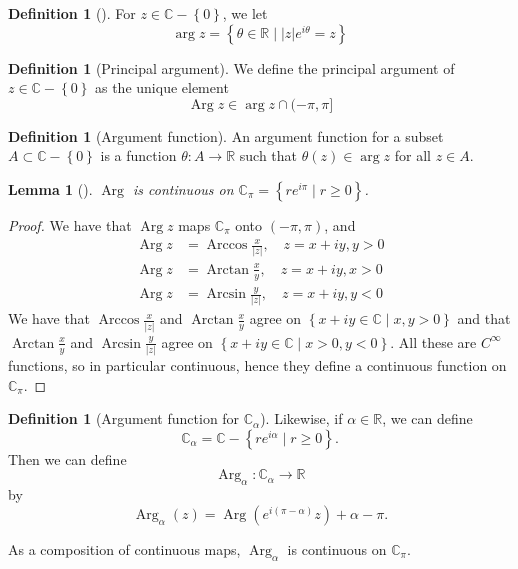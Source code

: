 \documentclass[reqno]{amsart}
\theoremstyle{plain}%
\newtheorem{lemma}[theorem]{Lemma}
\theoremstyle{definition}
\newtheorem{definition}[theorem]{Definition}
\theoremstyle{remark}
\DeclareMathOperator{\Arg}{Arg}
\DeclareMathOperator{\Arctan}{Arctan}
\DeclareMathOperator{\Arcsin}{Arcsin}
\DeclareMathOperator{\Arccos}{Arccos}
\begin{document}
    \begin{definition}[]
        For $z \in \mathbb{C} - \left\{ 0 \right\} $, we let
        \[
        \arg z = \left\{ \theta \in \mathbb{R}  \mid |z| e^{i \theta} = z \right\} 
        \] 
    \end{definition}

    \begin{definition}[Principal argument]
        We define the principal argument of $z \in \mathbb{C} - \left\{
        0 \right\} $ as the unique element
        \[
            \Arg z \in \arg z \cap (- \pi , \pi ]
        \] 
    \end{definition}

    \begin{definition}[Argument function]
        An argument function for a subset $A \subset \mathbb{C} - \left\{
        0 \right\} $ is a function 
        $\theta  \colon A \to \mathbb{R}$ such that 
        $\theta (z) \in \arg z$ for all $z \in A$.
    \end{definition}

    \begin{lemma}[]
        $\Arg $ is continuous on $\mathbb{C}_\pi = \left\{ r e^{i \pi}  \mid
        r \ge 0 \right\} $.
    \end{lemma}

    \begin{proof}
        We have that $\Arg z$ maps $\mathbb{C}_\pi$ onto $\left( -\pi , \pi
        \right) $, and
        \begin{align*}
            \Arg z &= \Arccos \frac{x}{|z|}, \quad z = x+iy, y > 0\\
            \Arg z &= \Arctan \frac{x}{y}, \quad z = x+iy, x>0\\
            \Arg z &= \Arcsin \frac{y}{|z|}, \quad z = x+iy, y<0
        \end{align*}
        We have that $\Arccos \frac{x}{|z|}$ and
        $\Arctan \frac{x}{y}$ agree on $\left\{ x+iy \in \mathbb{C}  \mid 
        x,y >0 \right\} $ and
        that $\Arctan \frac{x}{y}$ and
        $\Arcsin \frac{y}{|z|}$ agree on
        $\left\{ x+iy \in \mathbb{C}  \mid  x>0, y <0 \right\} $. All these
        are $C^{\infty}$ functions, so in particular continuous, hence
        they define a continuous function on
        $\mathbb{C}_\pi$.
    \end{proof}

    \begin{definition}[Argument function for $\mathbb{C}_{\alpha}$]
       Likewise, if $\alpha \in \mathbb{R}$, we can define
        \[
       \mathbb{C}_{\alpha} = \mathbb{C} - \left\{ 
       r e^{i \alpha}  \mid  r \ge 0 \right\}.
       \] 
       Then we can define 
       \[
       \Arg_{\alpha}  \colon \mathbb{C}_{\alpha} \to \mathbb{R}
       \] 
       by
       \[
       \Arg_{\alpha} (z) = \Arg \left( e^{i \left( \pi - \alpha \right) }z
       \right) + \alpha - \pi.
       \] 
    \end{definition}
    As a composition of continuous maps, $\Arg_{\alpha}$ is continuous
    on $\mathbb{C}_{\pi}$.
    
\end{document}

